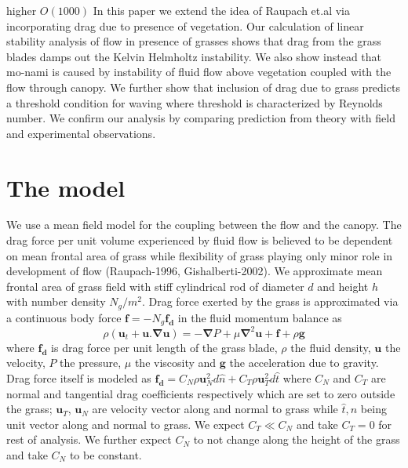 \documentclass[aps,twocolumn,floatfix,prl,10pt]{revtex4-1}
\newcommand{\bu}{\mathbf{u}}
\newcommand{\grad}{\mathbf{\nabla}}
\begin{document}
higher $O(1000)$
\newline 
 In this paper we extend the idea of Raupach et.al via incorporating drag due to presence of vegetation. Our calculation of linear stability analysis of flow in presence of grasses 
shows that drag from the grass blades damps out the Kelvin Helmholtz instability. We also show instead that mo-nami is caused by instability 
of fluid flow above vegetation coupled with the flow through canopy. We further show that inclusion of drag due to grass predicts a threshold condition for waving where threshold is
characterized by Reynolds number. We confirm our analysis by comparing prediction from theory with field and experimental observations.  

\section{The model}
We use a mean field model for the coupling between the flow and the canopy. The drag force per unit volume experienced by fluid flow is believed to be dependent on
mean frontal area of grass while flexibility of grass playing only minor role in development of flow (Raupach-1996, Gishalberti-2002).   
We approximate mean frontal area of grass field with stiff cylindrical rod of diameter $d$ and height $h$ with number density $N_g/m^2$. 
Drag force exerted by the grass is approximated via a continuous body force $\mathbf{f}=-N_g\mathbf{f_d}$ in the fluid momentum balance as
\begin{equation}
\rho \left(\bu_{t}+\bu.\grad\bu \right) = -\grad P+\mu\grad^{2}\bu +\mathbf{f}+\rho\mathbf{g}
\end{equation}
where $\mathbf{f_{d}}$ is drag force per unit length of the grass blade, $\rho$ the fluid density, $\mathbf{u}$ the velocity, $P$ the pressure, $\mu$ the viscosity and $\mathbf{g}$
the acceleration due to gravity. Drag force itself is modeled as $\mathbf{f_{d}}=C_N \rho\bu_{N}^{2}d\hat{n}+C_{T}\rho\bu_{T}^{2}d\hat{t}$ where 
$C_{N}$ and $C_{T}$ are normal and tangential drag coefficients respectively which are set to zero outside the grass; $\bu_{T}$, $\bu_{N}$ are velocity vector along and
normal to grass while $\hat{t},\hat{n}$ being unit vector along and normal to grass. We expect $C_T \ll C_N$ and take $C_T=0$ for rest of analysis. We further expect $C_N$ to
not change along the height of the grass and take $C_N$ to be constant. 
\end{document}
